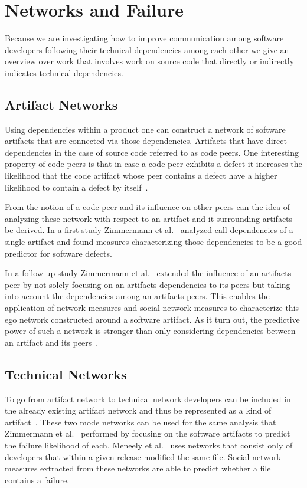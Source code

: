 \section{Networks and Failure}
Because we are investigating how to improve communication among software developers following their technical dependencies among each other we give an overview over work that involves work on source code that directly or indirectly indicates technical dependencies. 


\subsection{Artifact Networks}
\label{chap:6:an}
Using dependencies within a product one can construct a network of software artifacts that are connected via those dependencies.
Artifacts that have direct dependencies in the case of source code referred to as code peers.
One interesting property of code peers is that in case a code peer exhibits a defect it increases the likelihood that the code artifact whose peer contains a defect have a higher likelihood to contain a defect by itself~\cite{nguyen:icse:2010}.

From the notion of a code peer and its influence on other peers can the idea of analyzing these network with respect to an artifact and it surrounding artifacts be derived.
In a first study Zimmermann et al.~\cite{zimmermann:icse:2008} analyzed call dependencies of a single artifact and found measures characterizing those dependencies to be a good predictor for software defects.

In a follow up study Zimmermann et al.~\cite{zimmermann:esem:2009} extended the influence of an artifacts peer by not solely focusing on an artifacts dependencies to its peers but taking into account the dependencies among an artifacts peers.
This enables the application of network measures and social-network measures to characterize this ego network constructed around a software artifact.
As it turn out, the predictive power of such a network is stronger than only considering dependencies between an artifact and its peers~\cite{zimmermann:esem:2009}.

\subsection{Technical Networks}
\label{chap:6:tn}
To go from artifact network to technical network developers can be included in the already existing artifact network and thus be represented as a kind of artifact~\cite{pinzger:fse:2008}.
These two mode networks can be used for the same analysis that Zimmermann et al.~\cite{zimmermann:esem:2009,zimmermann:icse:2008} performed by focusing on the software artifacts to predict the failure likelihood of each.
%
Meneely et al.~\cite{meneely:fse:2008} uses networks that consist only of developers that within a given release modified the same file.
Social network measures extracted from these networks are able to predict whether a file contains a failure.




